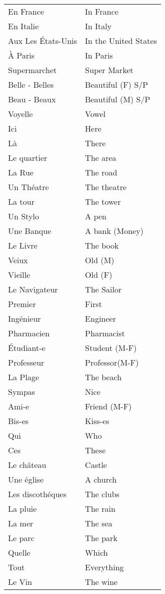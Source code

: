 \begin{longtable}{l  l}
En France	& In France	\\
En Italie	& In Italy	\\
Aux Les \'Etats-Unis & In the United States	\\
\`A Paris	& In Paris	\\
Supermarchet	& Super Market	\\
Belle - Belles  & Beautiful (F) S/P	\\
Beau - Beaux	& Beautiful (M) S/P	\\
Voyelle		& Vowel		\\
Ici		& Here		\\
L\`a		& There		\\
Le quartier	& The area	\\
La Rue		& The road	\\
Un Th\'eatre	& The theatre	\\
La tour		& The tower	\\
Un Stylo	& A pen		\\
Une Banque	& A bank (Money)\\
Le Livre	& The book	\\
Veiux		& Old (M)	\\
Vieille		& Old (F)	\\
Le Navigateur	& The Sailor	\\
Premier		& First		\\
Ing\'enieur	& Engineer	\\
Pharmacien	& Pharmacist	\\
\'Etudiant-e	& Student (M-F)	\\
Professeur	& Professor(M-F)\\
La Plage	& The beach	\\
Sympas		& Nice		\\
Ami-e		& Friend (M-F)	\\
Bis-es		& Kiss-es	\\
Qui		& Who		\\
Ces		& These		\\
Le ch\^ateau 	& Castle	\\
Une \'eglise	& A church	\\
Les discoth\'eques	& The clubs	\\
La pluie	& The rain	\\
La mer		& The sea	\\
Le parc		& The park	\\
Quelle		& Which		\\
Tout 		& Everything	\\
Le Vin		& The wine	\\

\end{longtable}
